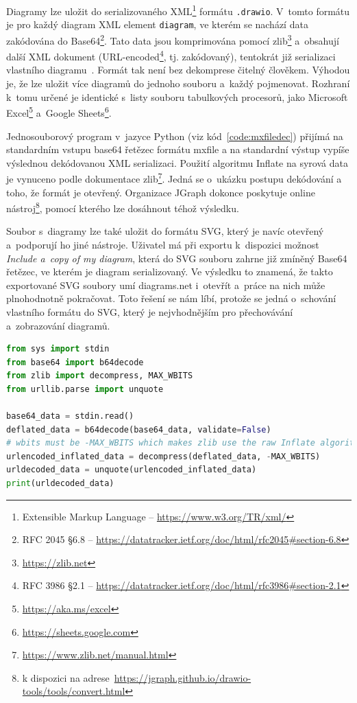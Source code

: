 Diagramy lze uložit do serializovaného XML\footnote{Extensible Markup Language -- \url{https://www.w3.org/TR/xml/}} formátu \texttt{.drawio}.
V~tomto formátu je pro každý diagram XML element \texttt{diagram}, ve kterém se nachází data zakódována do Base64\footnote{RFC 2045 \S6.8 -- \url{https://datatracker.ietf.org/doc/html/rfc2045\#section-6.8}}.
Tato data jsou komprimována pomocí zlib\footnote{\url{https://zlib.net}} a~obsahují další XML dokument (URL-encoded\footnote{RFC 3986 \S2.1 -- \url{https://datatracker.ietf.org/doc/html/rfc3986\#section-2.1}}, tj. zakódovaný), tentokrát již serializaci vlastního diagramu~\cite{seibert_extracting_2016}.
Formát tak není bez dekomprese čitelný člověkem.
Výhodou je, že lze uložit více diagramů do jednoho souboru a~každý pojmenovat.
Rozhraní k~tomu určené je identické s~listy souboru tabulkových procesorů, jako Microsoft Excel\footnote{\url{https://aka.ms/excel}} a~Google Sheets\footnote{\url{https://sheets.google.com}}.

Jednosouborový program v~jazyce Python (viz kód~\ref{code:mxfiledec}) přijímá na standardním vstupu base64 řetězec formátu mxfile a na standardní výstup vypíše výslednou dekódovanou XML serializaci.
Použití algoritmu Inflate na syrová data je vynuceno podle dokumentace zlib\footnote{\url{https://www.zlib.net/manual.html}}.
Jedná se o~ukázku postupu dekódování a toho, že formát je otevřený.
Organizace JGraph dokonce poskytuje online nástroj\footnote{k dispozici na adrese~\url{https://jgraph.github.io/drawio-tools/tools/convert.html}}, pomocí kterého lze dosáhnout téhož výsledku.

Soubor s~diagramy lze také uložit do formátu SVG, který je navíc otevřený a~podporují ho jiné nástroje.
Uživatel má při exportu k~dispozici možnost \textit{Include a~copy of my diagram}, která do SVG souboru zahrne již zmíněný Base64 řetězec, ve kterém je diagram serializovaný.
Ve výsledku to znamená, že takto exportované SVG soubory umí diagrams.net i~otevřít a~práce na nich může plnohodnotně pokračovat.
Toto řešení se nám líbí, protože se jedná o~schování vlastního formátu do SVG, který je nejvhodnějším pro přechovávání a~zobrazování diagramů.

\begin{lstlisting}[language=Python, caption=Dekódování mxfile, label=code:mxfiledec]
from sys import stdin
from base64 import b64decode
from zlib import decompress, MAX_WBITS
from urllib.parse import unquote

base64_data = stdin.read()
deflated_data = b64decode(base64_data, validate=False)
# wbits must be -MAX_WBITS which makes zlib use the raw Inflate algorithm without header detection
urlencoded_inflated_data = decompress(deflated_data, -MAX_WBITS)
urldecoded_data = unquote(urlencoded_inflated_data)
print(urldecoded_data)
\end{lstlisting}

